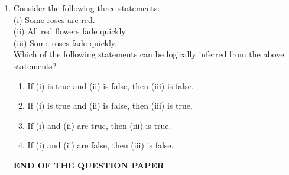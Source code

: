 \documentclass[12pt,a4paper]{article}
\renewcommand{\headrulewidth}{0.4pt}
\begin{document}
\begin{enumerate}
\pagebreak

\item Consider the following three statements:\\

\noindent	
(i) Some roses are red.\\
(ii) All red flowers fade quickly.\\
(iii) Some roses fade quickly.\\

\noindent
Which of the following statements can be logically inferred from the above statements?\hfill{}
\begin{enumerate}
\item If (i) is true and (ii) is false, then (iii) is false.
\item If (i) is true and (ii) is false, then (iii) is true.
\item If (i) and (ii) are true, then (iii) is true.
\item If (i) and (ii) are false, then (iii) is false.
\end{enumerate}

\vspace{5cm}

\begin{center}
	{\LARGE \textbf{END OF THE QUESTION PAPER}}
\end{center}


\clearpage
{}
\fancyfoot[R]{\thepage}

\renewcommand{\headrulewidth}{0.4pt}

\fancyfoot[R]{\thepage/\pageref{LastPage}}


\\


\end{enumerate}
\end{document}
